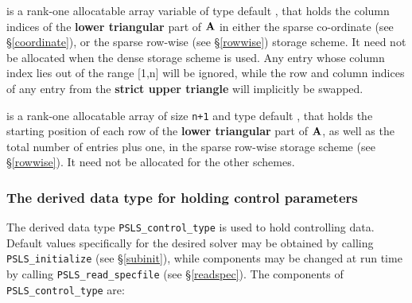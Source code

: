\documentclass{galahad}
\newcommand{\packagename}{PSLS}
\begin{document}
\begin{description}
 is a rank-one allocatable array variable of type default \integer,
that holds the column indices of the {\bf lower triangular} part of
${\mathbf{A}}$ in either the sparse co-ordinate
(see \S\ref{coordinate}), or the sparse row-wise
(see \S\ref{rowwise}) storage scheme.
It need not be allocated when the dense
storage scheme is used.
Any entry whose column index lies out of the range $[$1,n$]$ will be ignored,
while the row and column indices of any entry from the
{\bf strict upper triangle} will implicitly be swapped.

 is a rank-one allocatable array of size {\tt n+1} and type
default \integer, that holds the starting position of
each row of the {\bf lower triangular} part of ${\mathbf{A}}$, as well
as the total number of entries plus one, in the sparse row-wise storage
scheme (see \S\ref{rowwise}). It need not be allocated for the
other schemes.

\end{description}


\subsubsection{The derived data type for holding control
 parameters}\label{typecontrol}
The derived data type
{\tt \packagename\_control\_type}
is used to hold controlling data.
Default values specifically for the desired solver
may be obtained by calling
{\tt \packagename\_initialize}
(see \S\ref{subinit}),
while components may be changed at run time by calling
{\tt \packagename\_read\-\_specfile}
(see \S\ref{readspec}).
The components of
{\tt \packagename\_control\_type}
are:
\end{document}
